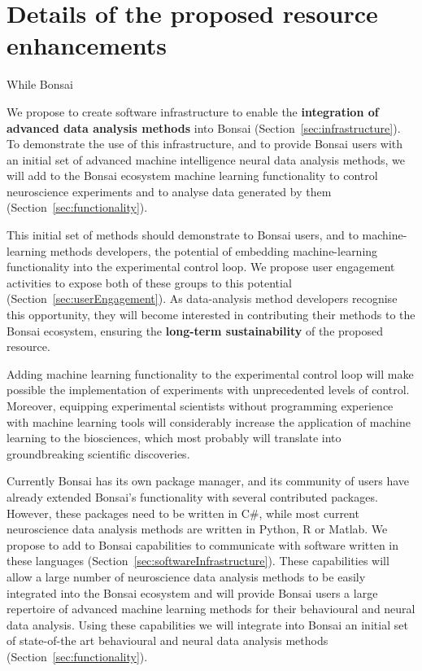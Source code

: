 

\section{Details of the proposed resource enhancements}

While Bonsai 



We
propose to create software infrastructure to enable the\textbf{ integration of advanced data analysis methods} into
Bonsai (Section~\ref{sec:infrastructure}).
%
To demonstrate the use of this infrastructure, and to provide Bonsai users with
an initial set of advanced machine intelligence neural data analysis methods,
we will add to the Bonsai ecosystem machine learning functionality to control
neuroscience experiments and to analyse data generated by them
(Section~\ref{sec:functionality}).

This initial set of methods should demonstrate to Bonsai users, and to
machine-learning methods developers, the potential of embedding
machine-learning functionality into the experimental control loop. We propose
user engagement activities to expose both of these groups to this
potential (Section~\ref{sec:userEngagement}).  As data-analysis method
developers recognise this opportunity, they will become interested in
contributing their methods to the Bonsai ecosystem, ensuring the
\textbf{long-term sustainability} of the proposed resource.

Adding machine learning functionality to the experimental control loop will
make possible the implementation of experiments with unprecedented levels of
control. Moreover, equipping experimental scientists without programming
experience with machine learning tools will considerably increase the
application of machine learning to the biosciences, which most probably will
translate into groundbreaking scientific discoveries.


Currently Bonsai has its own package manager, and its community of users have
already extended Bonsai's functionality with several contributed packages.
%
However, these packages need to
be written in C\#, while most current neuroscience data analysis methods are
written in Python, R or Matlab. We propose to add to Bonsai capabilities to
communicate with software written in these languages
(Section~\ref{sec:softwareInfrastructure}).  These capabilities will allow a
large number of neuroscience data analysis methods to be easily integrated into
the Bonsai ecosystem and will provide Bonsai users a large repertoire of
advanced machine learning methods for their behavioural and neural data
analysis.
%
Using these capabilities we will integrate into Bonsai an initial set of
state-of-the art behavioural and neural data analysis methods
(Section~\ref{sec:functionality}).

